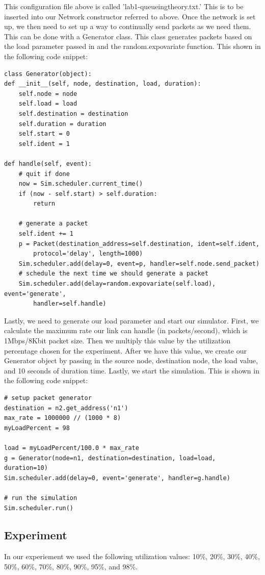 \documentclass[fleqn,11pt]{article}
\begin{document}
This configuration file above is called 'lab1-queueingtheory.txt.' This is to be inserted into our Network constructor referred to above.
Once the network is set up, we then need to set up a way to continually send packets as we need them. This can be done with a Generator class. This class generates packets based on the load parameter passed in and the random.expovariate function. This shown in the following code snippet: 
\begin{lstlisting}
class Generator(object):
def __init__(self, node, destination, load, duration):
	self.node = node
	self.load = load
	self.destination = destination
	self.duration = duration
	self.start = 0
	self.ident = 1

def handle(self, event):
	# quit if done
	now = Sim.scheduler.current_time()
	if (now - self.start) > self.duration:
		return

	# generate a packet
	self.ident += 1
	p = Packet(destination_address=self.destination, ident=self.ident, 
		protocol='delay', length=1000)
	Sim.scheduler.add(delay=0, event=p, handler=self.node.send_packet)
	# schedule the next time we should generate a packet
	Sim.scheduler.add(delay=random.expovariate(self.load), event='generate', 
		handler=self.handle)
\end{lstlisting}

Lastly, we need to generate our load parameter and start our simulator. First, we calculate the maximum rate our link can handle (in packets/second), which is 1Mbps/8Kbit packet size. Then we multiply this value by the utilization percentage chosen for the experiment. After we have this value, we create our Generator object by passing in the source node, destination node, the load value, and 10 seconds of duration time. Lastly, we start the simulation. This is shown in the following code snippet:
\begin{lstlisting}
# setup packet generator
destination = n2.get_address('n1')
max_rate = 1000000 // (1000 * 8)
myLoadPercent = 98

load = myLoadPercent/100.0 * max_rate
g = Generator(node=n1, destination=destination, load=load, duration=10)
Sim.scheduler.add(delay=0, event='generate', handler=g.handle)

# run the simulation
Sim.scheduler.run()
\end{lstlisting}
\subsection{Experiment}
In our experiement we used the following utilization values: 10\%, 20\%, 30\%, 40\%, 50\%, 60\%, 70\%, 80\%, 90\%, 95\%, and 98\%.
\end{document}

